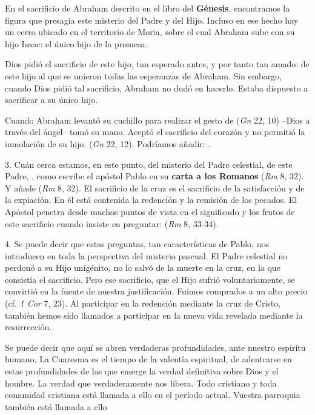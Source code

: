 \begin{body}
En el sacrificio de Abraham descrito en el libro del \textbf{Génesis}, encontramos la figura que presagia este misterio del Padre y del Hijo. Incluso en ese hecho hay un cerro ubicado en el territorio de Moria, sobre el cual Abraham sube con su hijo Isaac: el único hijo de la promesa.

Dios pidió el sacrificio de este hijo, tan esperado antes, y por tanto tan amado: de este hijo al que se unieron todas las esperanzas de Abraham. Sin embargo, cuando Dios pidió tal sacrificio, Abraham no dudó en hacerlo. Estaba dispuesto a sacrificar a su único hijo.

Cuando Abraham levantó su cuchillo para realizar el gesto de  (\textit{Gn} 22, 10) –Dios a través del ángel– tomó su mano. Aceptó el sacrificio del corazón y no permitió la inmolación de su hijo.  (\textit{Gn} 22, 12). Podríamos añadir: .

3. Cuán cerca estamos, en este punto, del misterio del Padre celestial, de este Padre, , como escribe el apóstol Pablo en su \textbf{carta a los Romanos} (\textit{Rm} 8, 32). Y añade  (\textit{Rm} 8, 32). El sacrificio de la cruz es el sacrificio de la satisfacción y de la expiación. En él está contenida la redención y la remisión de los pecados. El Apóstol penetra desde muchos puntos de vista en el significado y los frutos de este sacrificio cuando insiste en preguntar:  (\textit{Rm} 8, 33-34).

4. Se puede decir que estas preguntas, tan características de Pablo, nos introducen en toda la perspectiva del misterio pascual. El Padre celestial no perdonó a su Hijo unigénito, no lo salvó de la muerte en la cruz, en la que consistía el sacrificio. Pero ese sacrificio, que el Hijo sufrió voluntariamente, se convirtió en la fuente de nuestra justificación. Fuimos comprados a un alto precio (cf. \textit{1 Cor} 7, 23). Al participar en la redención mediante la cruz de Cristo, también hemos sido llamados a participar en la nueva vida revelada mediante la resurrección.

Se puede decir que aquí se abren verdaderas profundidades,  ante nuestro espíritu humano. La Cuaresma es el tiempo de la valentía espiritual, de adentrarse en estas profundidades de las que emerge la verdad definitiva sobre Dios y el hombre. La verdad que verdaderamente nos libera. Todo cristiano y toda comunidad cristiana está llamada a ello en el período actual. Vuestra parroquia también está llamada a ello 


\end{body}
